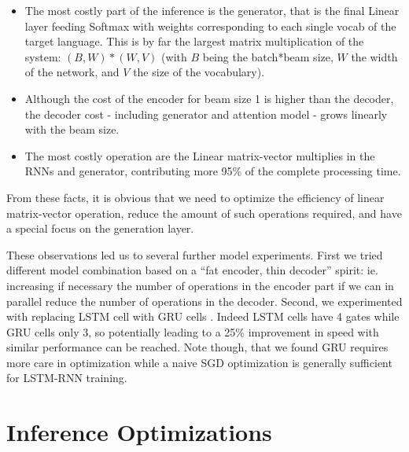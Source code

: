 \documentclass[11pt,a4paper]{article}
\begin{document}
\begin{itemize}
\item The most costly part of the inference is the generator, that is the final Linear layer feeding Softmax with weights corresponding to each single vocab of the target language. This is by far the largest matrix multiplication of the system: $(B,W) * (W,V)$ (with $B$ being the batch*beam size, $W$ the width of the network, and $V$ the size of the vocabulary).
\item Although the cost of the encoder for beam size 1 is higher than the decoder, the decoder cost - including generator and attention model - grows linearly with the beam size.
\item The most costly operation are the Linear matrix-vector multiplies in the RNNs and generator,
  contributing more 95\% of the complete processing time.
\end{itemize}

From these facts, it is obvious that we need to optimize the
efficiency of linear matrix-vector operation, reduce the amount of such operations
required, and have a special focus on the generation layer.

These observations led us to several further model experiments.  First
we tried different model combination based on a ``fat encoder, thin
decoder'' spirit: ie. increasing if necessary the number of operations
in the encoder part if we can in parallel reduce the number of
operations in the decoder. Second, we experimented with replacing LSTM
cell with GRU cells \cite{DBLP:journals/corr/ChoMGBSB14}. Indeed LSTM
cells have 4 gates while GRU cells only 3, so potentially leading to a
25\% improvement in speed with similar performance can be
reached. Note though, that we found GRU requires more care in optimization
while a naive SGD optimization is generally sufficient for
LSTM-RNN training.


\section{Inference Optimizations}



\end{document}
